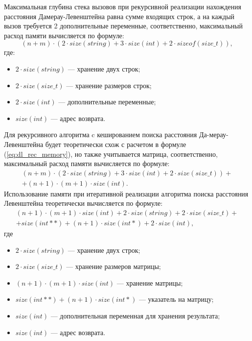 Максимальная глубина стека вызовов при рекурсивной реализации нахождения расстояния Дамерау-Левенштейна равна сумме входящих строк, а на каждый вызов требуется 2 дополнительные переменные, соответственно, максимальный расход памяти вычисляется по формуле:
\begin{equation}
	\label{eq:dl_rec_memory}
	(n + m) \cdot (2 \cdot size(string) + 3 \cdot size(int) + 2 \cdot sizeof(size\_t)),
\end{equation}
где:
\begin{itemize}
	\item $2 \cdot size(string)$ --- хранение двух строк;
	\item $2 \cdot size(size\_t)$ --- хранение размеров строк;
	\item $2 \cdot size(int)$ --- дополнительные переменные;
	\item $size(int)$ --- адрес возврата.
\end{itemize}

Для рекурсивного алгоритма c кешированием поиска расстояния Да-мерау-Левенштейна будет теоретически схож с расчетом в формуле (\ref{eq:dl_rec_memory}), но также учитывается матрица, соответственно, максимальный расход памяти вычисляется по формуле:
\begin{equation}
	\label{eq:dl_hash_memory}
	\begin{aligned}
		(n + m) \cdot (2 \cdot size(string) + 3 \cdot size(int) + 2 \cdot size(size\_t)) + \\
		+ (n + 1) \cdot (m + 1) \cdot size(int).
	\end{aligned}
\end{equation}
Использование памяти при итеративной реализации алгоритма поиска расстояния Левенштейна теоретически вычисляется по формуле:
\begin{equation}
	\label{eq:lev_mtr_memory}
	\begin{aligned}
		(n + 1) \cdot (m + 1) \cdot size(int) + 2 \cdot size(string) + 2 \cdot size(size\_t) + \\
		+ size(int **) + (n + 1) \cdot size(int *) + 2 \cdot size(int),
	\end{aligned}
\end{equation}
где
\begin{itemize}
	\item $2 \cdot size(string)$ --- хранение двух строк;
	\item $2 \cdot size(size\_t)$ --- хранение размеров матрицы;
	\item $(n + 1) \cdot (m + 1) \cdot size(int)$ --- хранение матрицы;
	\item $size(int **) + (n + 1) \cdot size(int *)$ --- указатель на матрицу;
	\item $size(int)$ --- дополнительная переменная для хранения результата;
	\item $size(int)$ --- адрес возврата.
\end{itemize}

